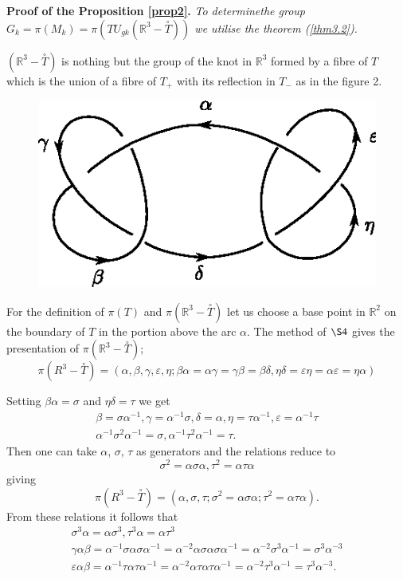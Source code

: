 \medskip
\noindent
\textbf{Proof of the Proposition \ref{prop2}.}
\textit{ To determine\pageoriginale the group $G_k = \pi (M_k) = \pi
  (T U_{gk}   (\mathbb{R}^3 - \overset{\circ}{T}))$ we utilise the theorem
  (\ref{thm3.2}). } 
 

$(\mathbb{R}^3 - \overset{\circ}{T})$ is nothing but the group of the knot
in $\mathbb{R}^3$ formed by a fibre of $T$ which is the union of a
fibre of $T_+$ with its reflection in $T_-$ as in the figure 2. 
\begin{figure}[H]
\centering
\includegraphics{vol44-fig/fig44-19.eps}
\end{figure}

For the definition of $\pi (T)$ and $\pi (\mathbb{R}^3 -
\overset{\circ}{T})$ let us choose a base point in $\mathbb{R}^2$ on the
boundary of $T$ in the portion above the arc $\alpha$. The method of
$\S 4$ gives the presentation of $\pi (\mathbb{R}^3 -
\overset{\circ}{T})$; 
$$
\pi (R^3 - \overset{\circ}{T}) = (\alpha, \beta, \gamma, \varepsilon, \eta 
; \beta \alpha = \alpha \gamma = \gamma \beta = \beta \delta, \eta\delta =
\varepsilon \eta = \alpha \varepsilon = \eta \alpha)  
$$

Setting $\beta \alpha = \sigma$ and $\eta \delta = \tau$ we get
\begin{gather*}
\beta = \sigma \alpha^{-1}, \gamma = \alpha^{-1} \sigma, \delta =
\alpha, \eta = \tau  \alpha^{-1}, \varepsilon = \alpha^{-1} \tau\\ 
\alpha^{-1} \sigma^2 \alpha^{-1} = \sigma, \alpha^{-1} \tau^2
\alpha^{-1} = \tau.  
\end{gather*}
Then one can take $\alpha$, $\sigma$, $\tau$ as generators and the
relations reduce to  
$$
\sigma^2 = \alpha \sigma \alpha, \tau^2 = \alpha \tau \alpha
$$
giving\pageoriginale 
$$
\pi (R^3 - \overset{\circ}{T}) = (\alpha, \sigma, \tau; \sigma^2 = \alpha
\sigma \alpha;  \tau^2 = \alpha \tau \alpha). 
$$
From these relations it follows that
\begin{gather*}
\sigma^3 \alpha = \alpha \sigma^3, \tau^3 \alpha = \alpha \tau^3 \\ 
\gamma \alpha \beta  = \alpha^{-1} \sigma \alpha\sigma \alpha^{-1} =
\alpha^{-2} \alpha \sigma \alpha  \sigma \alpha^{-1} = \alpha^{-2}
\sigma^3  \alpha^{-1} = \sigma^3 \alpha^{-3}\\ 
\varepsilon \alpha \beta = \alpha^{-1} \tau \alpha \tau \alpha^{-1} =
\alpha^{-2} \alpha \tau \alpha \tau \alpha^{-1} = \alpha^{-2} \tau^3
\alpha^{-1} = \tau^3 \alpha^{-3}	. 
\end{gather*}

